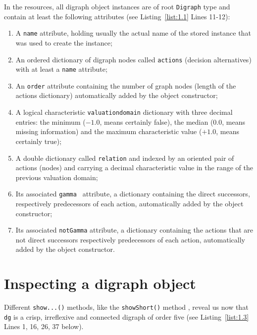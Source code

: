In the \Digraph resources, all digraph object instances are of root \texttt{Digraph} type and contain at least the following attributes (see Listing~\vref{list:1.1}  Lines 11-12):
\begin{enumerate}[leftmargin=0.5cm,listparindent=0em,nosep]
\item A \texttt{name} attribute, holding usually the actual name of the stored instance that was used to create the instance;
\item An ordered dictionary of digraph nodes called \texttt{actions} (decision alternatives) with at least a \texttt{name} attribute;
\item An \texttt{order} attribute containing the number of graph nodes (length of the actions dictionary) automatically added by the object constructor;
\item  A logical characteristic \texttt{valuationdomain} dictionary with three decimal entries: the minimum ($-1.0$, means certainly false), the median ($0.0$, means missing information) and the maximum characteristic value ($+1.0$, means certainly true);
\item A double dictionary called \texttt{relation} and indexed by an oriented pair of actions (nodes) and carrying a decimal characteristic value in the range of the previous valuation domain;
\item Its associated \texttt{gamma } attribute, a dictionary containing the direct successors, respectively predecessors of each action, automatically added by the object constructor;
\item Its associated \texttt{notGamma} attribute, a dictionary containing the actions that are not direct successors respectively predecessors of each action, automatically added by the object constructor.
\end{enumerate}

\section{Inspecting a digraph object}
\label{sec:1.4}

Different \texttt{show...()} methods, like the \texttt{showShort()} method , reveal us now that \texttt{dg} is a crisp, irreflexive and connected digraph of order five (see Listing~\vref{list:1.3}  Lines 1, 16, 26, 37 below).

